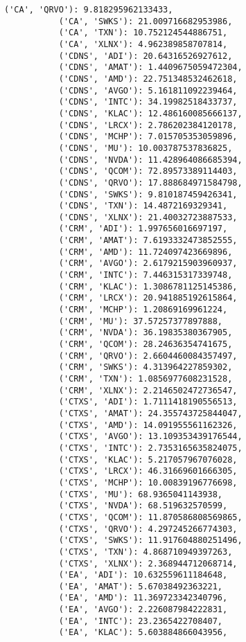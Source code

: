 \documentclass[11pt]{article}
\begin{document}
\begin{Verbatim}[commandchars=\\\{\}]
           ('CA', 'QRVO'): 9.818295962133433,
           ('CA', 'SWKS'): 21.009716682953986,
           ('CA', 'TXN'): 10.752124544886751,
           ('CA', 'XLNX'): 4.962389858707814,
           ('CDNS', 'ADI'): 20.64316526927612,
           ('CDNS', 'AMAT'): 1.4409675059472304,
           ('CDNS', 'AMD'): 22.751348532462618,
           ('CDNS', 'AVGO'): 5.161811092239464,
           ('CDNS', 'INTC'): 34.19982518433737,
           ('CDNS', 'KLAC'): 12.486160085666137,
           ('CDNS', 'LRCX'): 2.786202384120178,
           ('CDNS', 'MCHP'): 7.015705353059896,
           ('CDNS', 'MU'): 10.003787537836825,
           ('CDNS', 'NVDA'): 11.428964086685394,
           ('CDNS', 'QCOM'): 72.89573389114403,
           ('CDNS', 'QRVO'): 17.888684971584798,
           ('CDNS', 'SWKS'): 9.810187459426341,
           ('CDNS', 'TXN'): 14.4872169329341,
           ('CDNS', 'XLNX'): 21.40032723887533,
           ('CRM', 'ADI'): 1.997656016697197,
           ('CRM', 'AMAT'): 7.6193332473852555,
           ('CRM', 'AMD'): 11.724097423669896,
           ('CRM', 'AVGO'): 2.6179215903960937,
           ('CRM', 'INTC'): 7.446315317339748,
           ('CRM', 'KLAC'): 1.3086781125145386,
           ('CRM', 'LRCX'): 20.941885192615864,
           ('CRM', 'MCHP'): 1.20869169961224,
           ('CRM', 'MU'): 37.57257377897888,
           ('CRM', 'NVDA'): 36.19835380367905,
           ('CRM', 'QCOM'): 28.24636354741675,
           ('CRM', 'QRVO'): 2.6604460084357497,
           ('CRM', 'SWKS'): 4.313964227859302,
           ('CRM', 'TXN'): 1.0856977608231528,
           ('CRM', 'XLNX'): 2.2146502472736547,
           ('CTXS', 'ADI'): 1.7111418190556513,
           ('CTXS', 'AMAT'): 24.355743725844047,
           ('CTXS', 'AMD'): 14.091955561162326,
           ('CTXS', 'AVGO'): 13.109353439176544,
           ('CTXS', 'INTC'): 2.7353165635824075,
           ('CTXS', 'KLAC'): 5.217057967076028,
           ('CTXS', 'LRCX'): 46.31669601666305,
           ('CTXS', 'MCHP'): 10.00839196776698,
           ('CTXS', 'MU'): 68.9365041143938,
           ('CTXS', 'NVDA'): 68.519632570599,
           ('CTXS', 'QCOM'): 11.870586808569865,
           ('CTXS', 'QRVO'): 4.297245266774303,
           ('CTXS', 'SWKS'): 11.917604880251496,
           ('CTXS', 'TXN'): 4.868710949397263,
           ('CTXS', 'XLNX'): 2.368944712068714,
           ('EA', 'ADI'): 10.632559611184648,
           ('EA', 'AMAT'): 5.67038492363221,
           ('EA', 'AMD'): 11.369723342340796,
           ('EA', 'AVGO'): 2.226087984222831,
           ('EA', 'INTC'): 23.2365422708407,
           ('EA', 'KLAC'): 5.603884866043956,

\end{Verbatim}
\end{document}
